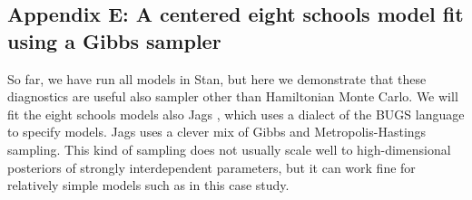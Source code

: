 \documentclass[american,]{article}
\let\oldparagraph\paragraph
\renewcommand{\paragraph}[1]{\oldparagraph{#1}\mbox{}}
\begin{document}



\hypertarget{eight-schools-with-jags}{%
\subsection*{Appendix E: A centered eight schools model fit using a Gibbs sampler}\label{eight-schools-with-jags}}

So far, we have run all models in Stan, but here we demonstrate that
these diagnostics are useful also sampler other than 
Hamiltonian Monte Carlo.  We will fit the eight schools models also
 Jags \citep{plummer2003jags}, which uses a dialect of the BUGS
language \citep{lunn2009bugs} to specify models. Jags uses a clever
mix of Gibbs and Metropolis-Hastings sampling. This kind of sampling
does not usually scale well to high-dimensional posteriors of strongly
interdependent parameters, but it can work fine for relatively simple models such as in this case study.


\end{document}
